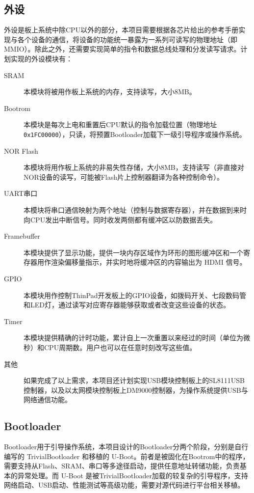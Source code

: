 \subsection{外设}

外设是板上系统中除CPU以外的部分，本项目需要根据各芯片给出的参考手册实现与各个设备的通信，将设备的功能统一暴露为一系列可读写的物理地址（即MMIO）。除此之外，还需要实现简单的指令和数据总线处理和分发读写请求。计划实现的外设模块有：

\begin{description}

    \item[SRAM] 本模块将被用作板上系统的内存，支持读写，大小8MB。
    \item[Bootrom] 本模块是每次上电和重置后CPU默认的指令加载位置（物理地址 \texttt{0x1FC00000}），只读，将预置Bootloader加载下一级引导程序或操作系统。
    \item[NOR Flash] 本模块将用作板上系统的非易失性存储，大小8MB，支持读写（非直接对NOR设备的读写，可能被Flash片上控制器翻译为各种控制命令）。
    \item[UART串口] 本模块将串口通信映射为两个地址（控制与数据寄存器），并在数据到来时向CPU发出中断信号。同时收发两侧都有缓冲区以防数据丢失。
    \item[Framebuffer] 本模块提供了显示功能，提供一块内存区域作为环形的图形缓冲区和一个寄存器用作渲染偏移量指示，并实时地将缓冲区的内容输出为 HDMI 信号。
    \item[GPIO] 本模块用作控制ThinPad开发板上的GPIO设备，如拨码开关、七段数码管和LED灯，通过读写对应寄存器能够获取或者改变这些设备的状态。
    \item[Timer] 本模块提供精确的计时功能，累计自上一次重置以来经过的时间（单位为微秒）和CPU周期数。用户也可以在任意时刻改写这些值。
    \item[其他] 如果完成了以上需求，本项目还计划实现USB模块控制板上的SL8111USB控制器，以及以太网模块控制板上DM9000控制器，为操作系统提供USB与网络通信功能。

\end{description}

\subsection{Bootloader}

Bootloader用于引导操作系统，本项目设计的Bootloader分两个阶段，分别是自行编写的 TrivialBootloader 和移植的 U-Boot。前者是被固化在Bootrom中的程序，需要支持从Flash、SRAM、串口等多途径启动，提供任意地址转储功能，负责基本的异常处理。而 U-Boot 是被TrivialBootloader加载的较复杂的引导程序，支持网络启动、USB启动、性能测试等高级功能，需要对源代码进行平台相关移植。

